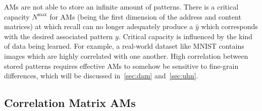 \documentclass{article}
\theoremstyle{definition}
\begin{document}
AMs are not able to store an infinite amount of patterns. There is a critical
capacity $N^\text{max}$ for AMs
(being the first dimension of the address and content matrices) at which
recall can no longer adequately produce a $\hat y$ which corresponds with
the desired associated pattern $y$. Critical capacity is
influenced by the kind of data being learned. For example, a real-world
dataset like MNIST \parencite{lecun_mnist_2010} contains images which are
highly correlated with one another. High correlation between stored patterns
requires effective AMs to somehow be sensitive to fine-grain differences, which
will be discussed in~\autoref{sec:dam} and~\autoref{sec:uhn}.

\subsection{Correlation Matrix AMs}\label{sec:correl}
\end{document}
